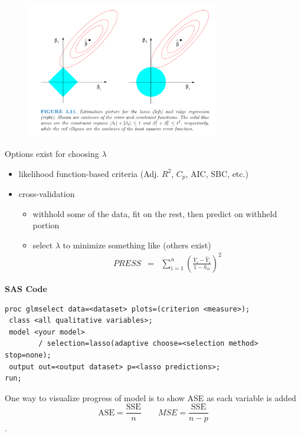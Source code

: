 \documentclass[12pt]{notes}
\begin{document}
\begin{figure}[H]
\centering
\includegraphics[width = 0.75\textwidth]{figures/module4/lasso.png}
\end{figure}

Options exist for choosing $\lambda$ %
\begin{itemize}
  \item likelihood function-based criteria (Adj. $R^2$, $C_p$, AIC, SBC, etc.)
  \item cross-validation
    \begin{itemize}
      \item withhold some of the data, fit on the rest, then predict on withheld portion
      \item select $\lambda$ to minimize something like (others exist)
        \begin{eqnarray}
          PRESS & = & \sum_{i=1}^{n} \left( \frac{Y_i - \hat{Y}_i }{1 - h_{ii}} \right)^2 \nonumber
        \end{eqnarray}
    \end{itemize}
\end{itemize}

\nspace
\textbf{SAS Code}
\begin{verbatim}
proc glmselect data=<dataset> plots=(criterion <measure>);
 class <all qualitative variables>;
 model <your model>
        / selection=lasso(adaptive choose=<selection method> stop=none);
 output out=<output dataset> p=<lasso predictions>;
run;
\end{verbatim}


One way to visualize progress of model is to show ASE as each variable is added\\ \vspace{4em}
$$\text{ASE} = \frac{\text{SSE}}{n} \qquad MSE = \frac{\text{SSE}}{n-p}$$. 
\end{document}
